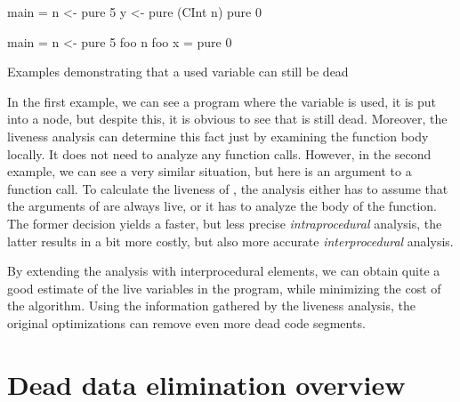 \documentclass[main.tex]{subfiles}
\begin{document}
	\begin{codeFloat}[h]
		\begin{center}
			\begin{minipage}{0.375\textwidth}
				\begin{haskell}
					main = 
					  n <- pure 5
					  y <- pure (CInt n)
					  pure 0
				\end{haskell}
			\end{minipage}
			\hspace{1cm}
			\begin{minipage}{0.375\textwidth}
				\begin{haskell}
					main = 
					  n <- pure 5
					  foo n
					foo x = pure 0
				\end{haskell}
			\end{minipage}
		\end{center}
		\caption{Examples demonstrating that a used variable can still be dead}
		\label{code:lva-example}
	\end{codeFloat}

	In the first example, we can see a program where the variable  is used, it is put into a  node, but despite this, it is obvious to see that  is still dead. Moreover, the liveness analysis can determine this fact just by examining the function body locally. It does not need to analyze any function calls. However, in the second example, we can see a very similar situation, but here  is an argument to a function call. To calculate the liveness of , the analysis either has to assume that the arguments of  are always live, or it has to analyze the body of the function. The former decision yields a faster, but less precise \emph{intraprocedural} analysis, the latter results in a bit more costly, but also more accurate \emph{interprocedural} analysis.
	
	By extending the analysis with interprocedural elements, we can obtain quite a good estimate of the live variables in the program, while minimizing the cost of the algorithm. Using the information gathered by the liveness analysis, the original optimizations can remove even more dead code segments.
	
	
	\section{Dead data elimination overview} \label{sec:dde}
	
	
\end{document}
